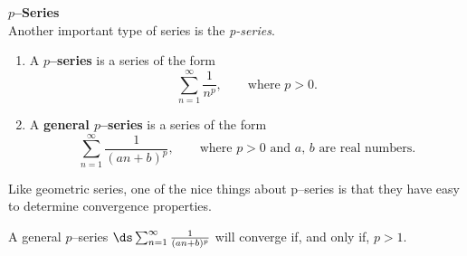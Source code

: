 \noindent\textbf{\large $p$--Series}\\

Another important type of series is the \emph{p-series}.

{\begin{enumerate}
\item	A \textbf{$p$--series} is a series of the form $$\sum_{n=1}^\infty \frac{1}{n^p}, \qquad \text{where $p>0$.}$$

\item	A \textbf{general $p$--series} is a series of the form 
$$\sum_{n=1}^\infty \frac{1}{(an+b)^p}, \qquad \text{where $p>0$ and $a$, $b$ are real numbers.}$$
\end{enumerate}
}

Like geometric series, one of the nice things about p--series is that they have easy to determine convergence properties.

{A general $p$--series $\ds\sum_{n=1}^\infty \frac{1}{(an+b)^p}$ will converge if, and only if, $p>1$.
}

